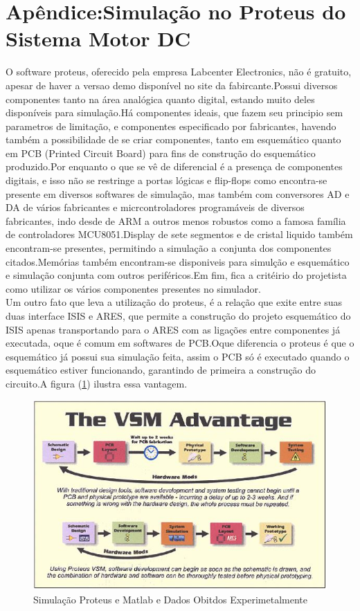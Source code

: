 \documentclass[11pt, a4paper, oneside]{article}
\begin{document}
 \newpage 

\section{Apêndice:Simulação no Proteus do Sistema Motor DC}
O software proteus, oferecido pela empresa Labcenter Electronics, não é gratuito, apesar de haver a versao demo disponível no site da fabircante.Possui diversos componentes tanto na área analógica quanto digital, estando muito deles disponíveis para simulação.Há componentes ideais, que fazem seu principio sem parametros de limitação, e componentes especificado por fabricantes, havendo também a possibilidade de se criar componentes, tanto em esquemático quanto em PCB (Printed Circuit Board) para fins de construção do esquemático produzido.Por enquanto o que se vê de diferencial é a presença de componentes digitais, e isso não se restringe a portas lógicas e flip-flops como encontra-se presente em diversos softwares de simulação, mas também com conversores AD e DA de vários fabricantes e micrcontroladores programáveis de diversos fabricantes, indo desde de ARM a outros menos robustos como a famosa família de controladores MCU8051.Display de sete segmentos e de cristal liquido também encontram-se presentes, permitindo a simulação a conjunta dos componentes citados.Memórias também encontram-se disponiveis para simulção e esquemático e simulação conjunta com outros periféricos.Em fim, fica a critéirio do projetista como utilizar os vários componentes presentes no simulador.\\
Um outro fato que leva a utilização do proteus, é a relação que exite entre suas duas interface ISIS e ARES, que permite a construção do projeto esquemático do ISIS  apenas transportando para o ARES com as ligações entre componentes já executada, oque é comum em softwares de PCB.Oque diferencia  o proteus é que o esquemático já possui sua simulação feita, assim o PCB só é executado quando o esquemático estiver funcionando, garantindo de primeira a construção do circuito.A figura (\ref{PCB_esquematico}) ilustra essa vantagem.\\

\begin{figure}[h!]
\centering
\includegraphics[width=.5\textwidth]{Simulcao_proteus_esquematico_PCB.jpg}
\caption{Simulação Proteus e Matlab e Dados Obitdos Experimetalmente \cite{labcenter}}
\label{PCB_esquematico}
\end{figure}
\end{document}
